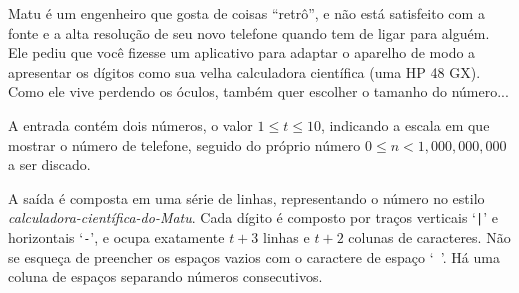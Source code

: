 
%
%
%
%

Matu é um engenheiro que gosta de coisas ``retrô'', e não está satisfeito com a fonte e a alta resolução de seu novo telefone quando tem de ligar para alguém. Ele pediu que você fizesse um aplicativo para adaptar o aparelho de modo a apresentar os dígitos como sua velha calculadora científica (uma HP 48 GX). Como ele vive perdendo os óculos, também quer escolher o tamanho do número...

\Entrada%
A entrada contém dois números, o valor $1 \leq t \leq 10$, indicando a escala em que mostrar o número de telefone, seguido do próprio número $0 \leq n < 1,000,000,000$ a ser discado.

\Saida%
A saída é composta em uma série de linhas, representando o número no estilo \emph{calculadora-científica-do-Matu}. Cada dígito é composto por traços verticais `\texttt{|}' e horizontais `\texttt{-}', e ocupa exatamente $t + 3$ linhas e $t + 2$ colunas de caracteres. Não se esqueça de preencher os espaços vazios com o caractere de espaço `\texttt{ }'. Há uma coluna de espaços separando números consecutivos.

%
